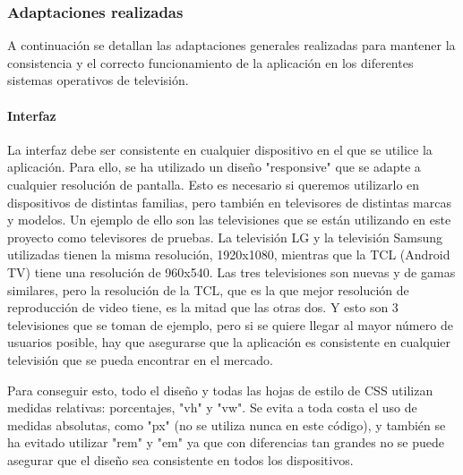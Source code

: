 \subsubsection{Adaptaciones realizadas}
\label{sec:adaptaciones}

A continuación se detallan las adaptaciones generales realizadas para mantener la consistencia y el correcto
funcionamiento de la aplicación en los diferentes sistemas operativos de televisión.

\paragraph{Interfaz}
La interfaz debe ser consistente en cualquier dispositivo en el que se utilice la aplicación. Para ello, se ha 
utilizado un diseño "responsive" que se adapte a cualquier resolución de pantalla. Esto es necesario si queremos utilizarlo
en dispositivos de distintas familias, pero también en televisores de distintas marcas y modelos. Un ejemplo de ello son 
las televisiones que se están utilizando en este proyecto como televisores de pruebas. La televisión LG y la televisión Samsung
utilizadas tienen la misma resolución, 1920x1080, mientras que la TCL (Android TV) tiene una resolución de 960x540. Las 
tres televisiones son nuevas y de gamas similares, pero la resolución de la TCL, que es la que mejor resolución de 
reproducción de video tiene, es la mitad que las otras dos. Y esto son 3 televisiones que se toman de ejemplo, pero 
si se quiere llegar al mayor número de usuarios posible, hay que asegurarse que la aplicación es consistente en cualquier
televisión que se pueda encontrar en el mercado. 

Para conseguir esto, todo el diseño y todas las hojas de estilo de CSS utilizan medidas relativas: porcentajes, "vh" y "vw". 
Se evita a toda costa el uso de medidas absolutas, como "px" (no se utiliza nunca en este código), y también se ha 
evitado utilizar "rem" y "em" ya que con diferencias tan grandes no se puede asegurar que el diseño sea consistente en
todos los dispositivos.

